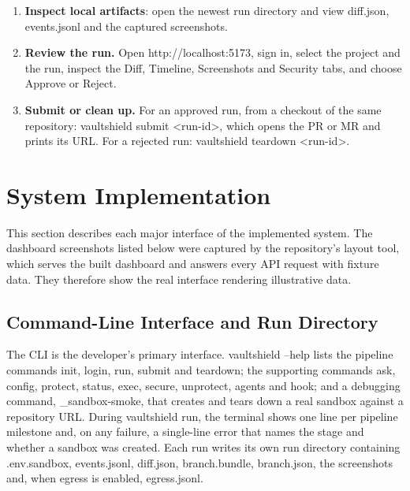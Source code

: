 \documentclass[12pt,a4paper,oneside]{report}
\begin{document}
\begin{enumerate}
\begin{lstlisting}[language=bash]
vaultshield run --agent=mock --prompt="add a file" \
  --repo-url="$REPO" --base-image=vaultshield-sandbox:local \
  --project "$PROJECT_ID" [--egress=allowlist]
\end{lstlisting}

  A successful run prints the run identifier, ``Sandbox created'', ``Committed run \ldots{} to branch vaultshield/run-'', ``Sandbox torn down'' and ``Run \ldots{} complete'', uploads the artifacts and leaves the run in awaiting\_\allowbreak{}review.
\item
  \textbf{Inspect local artifacts}: open the newest run directory and view diff.json, events.jsonl and the captured screenshots.
\item
  \textbf{Review the run.} Open http://localhost:5173, sign in, select the project and the run, inspect the Diff, Timeline, Screenshots and Security tabs, and choose Approve or Reject.
\item
  \textbf{Submit or clean up.} For an approved run, from a checkout of the same repository: vaultshield submit <run-id>, which opens the PR or MR and prints its URL. For a rejected run: vaultshield teardown <run-id>.
\end{enumerate}

\section{System Implementation}\label{system-implementation}

This section describes each major interface of the implemented system. The dashboard screenshots listed below were captured by the repository's layout tool, which serves the built dashboard and answers every API request with fixture data. They therefore show the real interface rendering illustrative data. 

\subsection{Command-Line Interface and Run Directory}\label{command-line-interface-and-run-directory}

The CLI is the developer's primary interface. vaultshield --help lists the pipeline commands init, login, run, submit and teardown; the supporting commands ask, config, protect, status, exec, secure, unprotect, agents and hook; and a debugging command, \_sandbox-smoke, that creates and tears down a real sandbox against a repository URL. During vaultshield run, the terminal shows one line per pipeline milestone and, on any failure, a single-line error that names the stage and whether a sandbox was created. Each run writes its own run directory containing .env.sandbox, events.jsonl, diff.json, branch.bundle, branch.json, the screenshots and, when egress is enabled, egress.jsonl.
\end{document}
